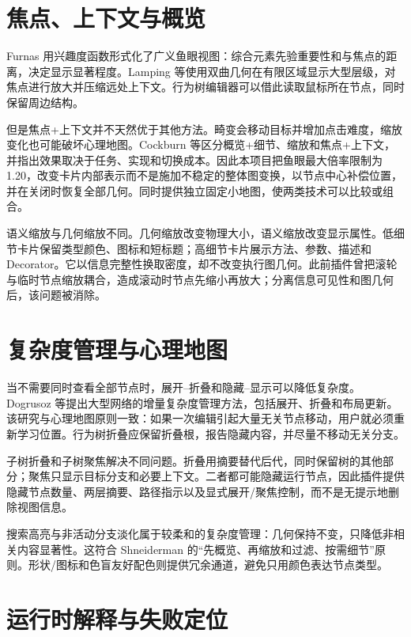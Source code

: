 \section{焦点、上下文与概览}

Furnas 用兴趣度函数形式化了广义鱼眼视图：综合元素先验重要性和与焦点的距离，决定显示显著程度\parencite{furnas1986fisheye}。Lamping 等使用双曲几何在有限区域显示大型层级，对焦点进行放大并压缩远处上下文\parencite{lamping1995hyperbolic}。行为树编辑器可以借此读取鼠标所在节点，同时保留周边结构。

但是焦点+上下文并不天然优于其他方法。畸变会移动目标并增加点击难度，缩放变化也可能破坏心理地图。Cockburn 等区分概览+细节、缩放和焦点+上下文，并指出效果取决于任务、实现和切换成本\parencite{cockburn2008review}。因此本项目把鱼眼最大倍率限制为 1.20，改变卡片内部表示而不是施加不稳定的整体图变换，以节点中心补偿位置，并在关闭时恢复全部几何。同时提供独立固定小地图，使两类技术可以比较或组合。

语义缩放与几何缩放不同。几何缩放改变物理大小，语义缩放改变显示属性。低细节卡片保留类型颜色、图标和短标题；高细节卡片展示方法、参数、描述和 Decorator。它以信息完整性换取密度，却不改变执行图几何。此前插件曾把滚轮与临时节点缩放耦合，造成滚动时节点先缩小再放大；分离信息可见性和图几何后，该问题被消除。

\section{复杂度管理与心理地图}

当不需要同时查看全部节点时，展开--折叠和隐藏--显示可以降低复杂度。Dogrusoz 等提出大型网络的增量复杂度管理方法，包括展开、折叠和布局更新\parencite{dogrusoz2018complexity}。该研究与心理地图原则一致：如果一次编辑引起大量无关节点移动，用户就必须重新学习位置\parencite{misue1995mentalmap}。行为树折叠应保留折叠根，报告隐藏内容，并尽量不移动无关分支。

子树折叠和子树聚焦解决不同问题。折叠用摘要替代后代，同时保留树的其他部分；聚焦只显示目标分支和必要上下文。二者都可能隐藏运行节点，因此插件提供隐藏节点数量、两层摘要、路径指示以及显式展开/聚焦控制，而不是无提示地删除视图信息。

搜索高亮与非活动分支淡化属于较柔和的复杂度管理：几何保持不变，只降低非相关内容显著性。这符合 Shneiderman 的“先概览、再缩放和过滤、按需细节”原则\parencite{shneiderman1996eyes}。形状/图标和色盲友好配色则提供冗余通道，避免只用颜色表达节点类型。

\section{运行时解释与失败定位}

